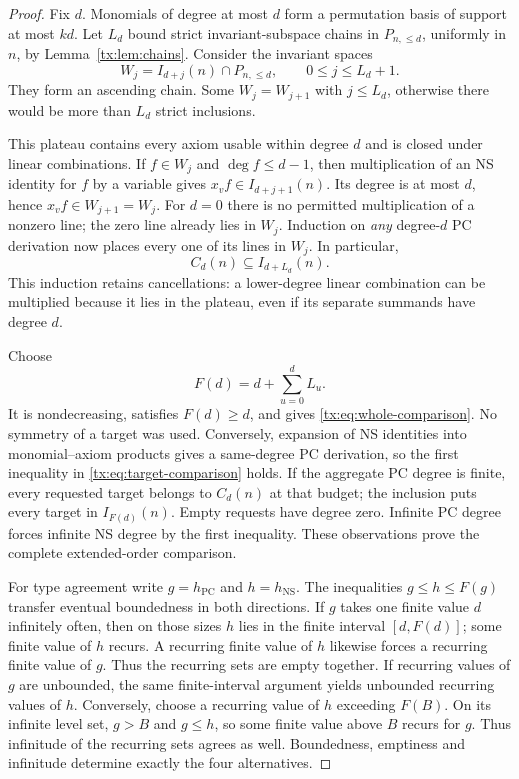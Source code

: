 \documentclass[11pt,a4paper,oneside,openany]{book}
\theoremstyle{definition}\newtheorem{definition}[theorem]{Definition}
\theoremstyle{remark}\newtheorem{remark}[theorem]{Remark}
\newcommand{\NS}{\mathrm{NS}}\newcommand{\PC}{\mathrm{PC}}
\numberwithin{equation}{chapter}
\begin{document}
\begin{proof}
Fix $d$. Monomials of degree at most $d$ form a permutation basis of
support at most $kd$. Let $L_d$ bound strict invariant-subspace chains in
$P_{n,\le d}$, uniformly in $n$, by Lemma~\ref{tx:lem:chains}.
Consider the invariant spaces
\[
              W_j=I_{d+j}(n)\cap P_{n,\le d},
                    \qquad 0\le j\le L_d+1.
\]
They form an ascending chain. Some $W_j=W_{j+1}$ with $j\le L_d$,
otherwise there would be more than $L_d$ strict inclusions.

This plateau contains every axiom usable within degree $d$ and is closed
under linear combinations. If $f\in W_j$ and $\deg f\le d-1$, then
multiplication of an NS identity for $f$ by a variable gives
$x_vf\in I_{d+j+1}(n)$. Its degree is at most $d$, hence
$x_vf\in W_{j+1}=W_j$. For $d=0$ there is no permitted multiplication
of a nonzero line; the zero line already lies in $W_j$.
Induction on \emph{any} degree-$d$ PC derivation now places every one of
its lines in $W_j$. In particular,
\[
                          C_d(n)\subseteq I_{d+L_d}(n).
\]
This induction retains cancellations: a lower-degree linear combination
can be multiplied because it lies in the plateau, even if its separate
summands have degree $d$.

Choose
\[
                          F(d)=d+\sum_{u=0}^d L_u.
\]
It is nondecreasing, satisfies $F(d)\ge d$, and gives
\eqref{tx:eq:whole-comparison}. No symmetry of a target was used.
Conversely, expansion of NS identities into monomial--axiom products
gives a same-degree PC derivation, so the first inequality in
\eqref{tx:eq:target-comparison} holds. If the aggregate PC degree is finite,
every requested target belongs to $C_d(n)$ at that budget; the inclusion
puts every target in $I_{F(d)}(n)$. Empty requests have degree zero.
Infinite PC degree forces infinite NS degree by the first inequality.
These observations prove the complete extended-order comparison.

For type agreement write $g=h_{\PC}$ and $h=h_{\NS}$.
The inequalities $g\le h\le F(g)$ transfer eventual boundedness in both
directions. If $g$ takes one finite value $d$ infinitely often, then on
those sizes $h$ lies in the finite interval $[d,F(d)]$; some finite value
of $h$ recurs. A recurring finite value of $h$ likewise forces a recurring
finite value of $g$. Thus the recurring sets are empty together.
If recurring values of $g$ are unbounded, the same finite-interval
argument yields unbounded recurring values of $h$. Conversely, choose a
recurring value of $h$ exceeding $F(B)$. On its infinite level set,
$g>B$ and $g\le h$, so some finite value above $B$ recurs for $g$.
Thus infinitude of the recurring sets agrees as well. Boundedness,
emptiness and infinitude determine exactly the four alternatives.
\end{proof}
\end{document}
